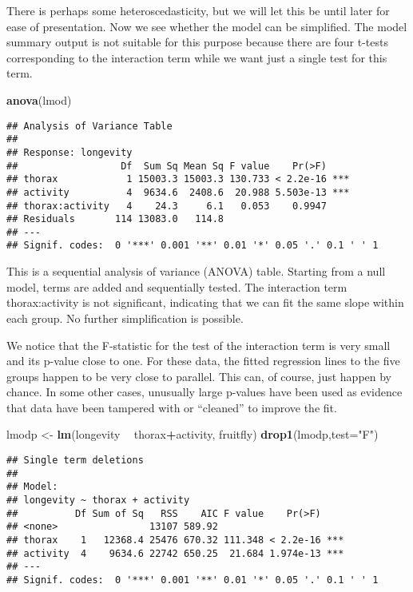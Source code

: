 \documentclass[
]{article}
\newenvironment{Shaded}{\begin{snugshade}}{\end{snugshade}}
\newcommand{\DataTypeTok}[1]{\textcolor[rgb]{0.13,0.29,0.53}{#1}}
\newcommand{\KeywordTok}[1]{\textcolor[rgb]{0.13,0.29,0.53}{\textbf{#1}}}
\newcommand{\NormalTok}[1]{#1}
\newcommand{\OperatorTok}[1]{\textcolor[rgb]{0.81,0.36,0.00}{\textbf{#1}}}
\newcommand{\StringTok}[1]{\textcolor[rgb]{0.31,0.60,0.02}{#1}}
\begin{document}
There is perhaps some heteroscedasticity, but we will let this be until
later for ease of presentation. Now we see whether the model can be
simplified. The model summary output is not suitable for this purpose
because there are four t-tests corresponding to the interaction term
while we want just a single test for this term.

\begin{Shaded}
\begin{Highlighting}[]
\KeywordTok{anova}\NormalTok{(lmod)}
\end{Highlighting}
\end{Shaded}

\begin{verbatim}
## Analysis of Variance Table
## 
## Response: longevity
##                  Df  Sum Sq Mean Sq F value    Pr(>F)    
## thorax            1 15003.3 15003.3 130.733 < 2.2e-16 ***
## activity          4  9634.6  2408.6  20.988 5.503e-13 ***
## thorax:activity   4    24.3     6.1   0.053    0.9947    
## Residuals       114 13083.0   114.8                      
## ---
## Signif. codes:  0 '***' 0.001 '**' 0.01 '*' 0.05 '.' 0.1 ' ' 1
\end{verbatim}

This is a sequential analysis of variance (ANOVA) table. Starting from a
null model, terms are added and sequentially tested. The interaction
term thorax:activity is not significant, indicating that we can fit the
same slope within each group. No further simplification is possible.

We notice that the F-statistic for the test of the interaction term is
very small and its p-value close to one. For these data, the fitted
regression lines to the five groups happen to be very close to parallel.
This can, of course, just happen by chance. In some other cases,
unusually large p-values have been used as evidence that data have been
tampered with or ``cleaned'' to improve the fit.

\begin{Shaded}
\begin{Highlighting}[]
\NormalTok{lmodp <-}\StringTok{ }\KeywordTok{lm}\NormalTok{(longevity }\OperatorTok{~}\StringTok{ }\NormalTok{thorax}\OperatorTok{+}\NormalTok{activity, fruitfly)}
\KeywordTok{drop1}\NormalTok{(lmodp,}\DataTypeTok{test=}\StringTok{"F"}\NormalTok{)}
\end{Highlighting}
\end{Shaded}

\begin{verbatim}
## Single term deletions
## 
## Model:
## longevity ~ thorax + activity
##          Df Sum of Sq   RSS    AIC F value    Pr(>F)    
## <none>                13107 589.92                      
## thorax    1   12368.4 25476 670.32 111.348 < 2.2e-16 ***
## activity  4    9634.6 22742 650.25  21.684 1.974e-13 ***
## ---
## Signif. codes:  0 '***' 0.001 '**' 0.01 '*' 0.05 '.' 0.1 ' ' 1
\end{verbatim}
\end{document}
